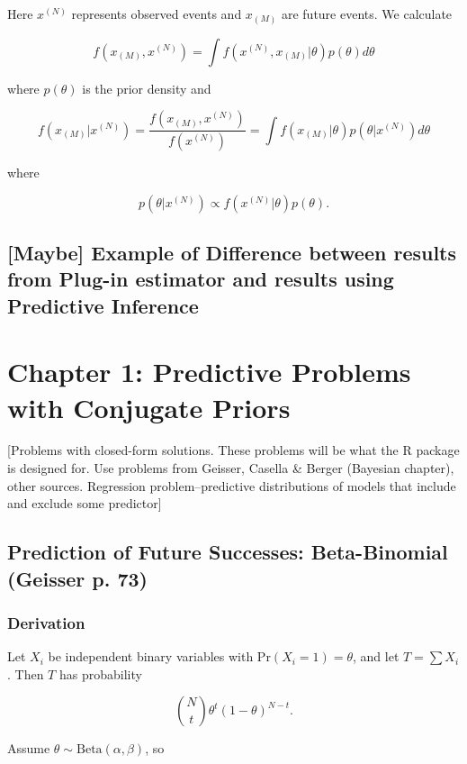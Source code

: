 \documentclass[12pt, a4paper]{article}
\begin{document}
    Here $x^{(N)}$ represents observed events and $x_{(M)}$ are future events.  We calculate

    $$f\left(x_{(M)},x^{(N)}\right) = \int f\left(x^{(N)},x_{(M)}|\theta\right)p(\theta)d\theta$$

    where $p(\theta)$ is the prior density and

    $$f\left(x_{(M)}|x^{(N)}\right) = \frac{f\left(x_{(M)},x^{(N)}\right)}{f\left(x^{(N)}\right)} = \int f\left(x_{(M)}|\theta\right)p\left(\theta|x^{(N)}\right)d\theta$$

    where

    $$p\left(\theta|x^{(N)}\right) \propto f\left(x^{(N)}|\theta\right)p(\theta).$$

  \subsection{[Maybe] Example of Difference between results from Plug-in estimator and results using Predictive Inference}

\clearpage

\section{Chapter 1:  Predictive Problems with Conjugate Priors}

  [Problems with closed-form solutions.  These problems will be what the R package is designed for.  Use problems from Geisser, Casella \& Berger (Bayesian chapter), other sources.  Regression problem--predictive distributions of models that include and exclude some predictor]

  \subsection{Prediction of Future Successes:  Beta-Binomial (Geisser p. 73)}


    \subsubsection{Derivation}

      Let $X_i$ be independent binary variables with Pr$(X_i = 1) = \theta$, and let $T = \sum X_i$.  Then $T$ has probability

      $${N\choose t}\theta^t(1-\theta)^{N-t}.$$

      \vspace{5mm}

      Assume $\theta\sim\text{Beta}(\alpha,\beta)$, so
\end{document}
